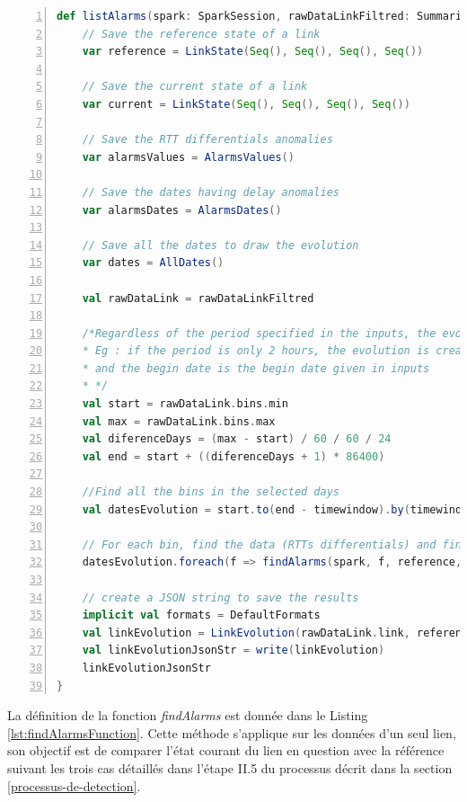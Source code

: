 \begin{lstlisting}[language=scala,firstnumber=1, caption={Définition de la méthode listAlarms},label={lst:findAnalomalies}, basicstyle = \footnotesize,escapechar=|,numbers=left,
stepnumber=1]
  def listAlarms(spark: SparkSession, rawDataLinkFiltred: SummarizedLink, timewindow: Int, rangeDates: Seq[Int]): String = {
	// Save the reference state of a link
	var reference = LinkState(Seq(), Seq(), Seq(), Seq())
	
	// Save the current state of a link
	var current = LinkState(Seq(), Seq(), Seq(), Seq())
	
	// Save the RTT differentials anomalies
	var alarmsValues = AlarmsValues()
	
	// Save the dates having delay anomalies
	var alarmsDates = AlarmsDates()
	
	// Save all the dates to draw the evolution 
	var dates = AllDates()
	
	val rawDataLink = rawDataLinkFiltred
	
	/*Regardless of the period specified in the inputs, the evolution is created for one or more days
	* Eg : if the period is only 2 hours, the evolution is created for 24 hours,
	* and the begin date is the begin date given in inputs
	* */
	val start = rawDataLink.bins.min
	val max = rawDataLink.bins.max
	val diferenceDays = (max - start) / 60 / 60 / 24
	val end = start + ((diferenceDays + 1) * 86400)
	
	//Find all the bins in the selected days
	val datesEvolution = start.to(end - timewindow).by(timewindow)
	
	// For each bin, find the data (RTTs differentials) and find alarms
	datesEvolution.foreach(f => findAlarms(spark, f, reference, rawDataLink, current, alarmsDates, alarmsValues, dates))
	
	// create a JSON string to save the results
	implicit val formats = DefaultFormats
	val linkEvolution = LinkEvolution(rawDataLink.link, reference, current, alarmsDates.dates, alarmsValues.medians, dates.dates)
	val linkEvolutionJsonStr = write(linkEvolution)
	linkEvolutionJsonStr
}
\end{lstlisting}

La définition de la fonction \textit{findAlarms} est donnée dans le Listing \ref{lst:findAlarmsFunction}. Cette méthode s'applique sur les données d'un seul lien,
son objectif  est de comparer l'état courant du lien en question avec la référence suivant les trois cas détaillés dans l'étape II.5 du processus décrit dans la section \ref{processus-de-detection}.


